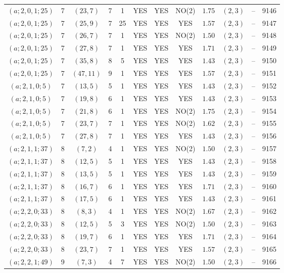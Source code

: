 \begin{longtable}{|c|c|c|c|c|c|c|c|c|c|c|c|}
$(a;2,0,1;25)$ & 7 & $(23,7)$ & 7 & 1 & YES & YES & NO(2) & $1.75$ & $(2,3)$ & -- & 9146\\
$(a;2,0,1;25)$ & 7 & $(25,9)$ & 7 & 25 & YES & YES & YES & $1.57$ & $(2,3)$ & -- & 9147\\
$(a;2,0,1;25)$ & 7 & $(26,7)$ & 7 & 1 & YES & YES & NO(2) & $1.50$ & $(2,3)$ & -- & 9148\\
$(a;2,0,1;25)$ & 7 & $(27,8)$ & 7 & 1 & YES & YES & YES & $1.71$ & $(2,3)$ & -- & 9149\\
$(a;2,0,1;25)$ & 7 & $(35,8)$ & 8 & 5 & YES & YES & YES & $1.43$ & $(2,3)$ & -- & 9150\\
$(a;2,0,1;25)$ & 7 & $(47,11)$ & 9 & 1 & YES & YES & YES & $1.57$ & $(2,3)$ & -- & 9151\\
$(a;2,1,0;5)$ & 7 & $(13,5)$ & 5 & 1 & YES & YES & YES & $1.43$ & $(2,3)$ & -- & 9152\\
$(a;2,1,0;5)$ & 7 & $(19,8)$ & 6 & 1 & YES & YES & YES & $1.43$ & $(2,3)$ & -- & 9153\\
$(a;2,1,0;5)$ & 7 & $(21,8)$ & 6 & 1 & YES & YES & NO(2) & $1.75$ & $(2,3)$ & -- & 9154\\
$(a;2,1,0;5)$ & 7 & $(23,7)$ & 7 & 1 & YES & YES & NO(2) & $1.62$ & $(2,3)$ & -- & 9155\\
$(a;2,1,0;5)$ & 7 & $(27,8)$ & 7 & 1 & YES & YES & YES & $1.43$ & $(2,3)$ & -- & 9156\\
$(a;2,1,1;37)$ & 8 & $(7,2)$ & 4 & 1 & YES & YES & NO(2) & $1.50$ & $(2,3)$ & -- & 9157\\
$(a;2,1,1;37)$ & 8 & $(12,5)$ & 5 & 1 & YES & YES & YES & $1.43$ & $(2,3)$ & -- & 9158\\
$(a;2,1,1;37)$ & 8 & $(13,5)$ & 5 & 1 & YES & YES & YES & $1.43$ & $(2,3)$ & -- & 9159\\
$(a;2,1,1;37)$ & 8 & $(16,7)$ & 6 & 1 & YES & YES & YES & $1.71$ & $(2,3)$ & -- & 9160\\
$(a;2,1,1;37)$ & 8 & $(17,5)$ & 6 & 1 & YES & YES & YES & $1.43$ & $(2,3)$ & -- & 9161\\
$(a;2,2,0;33)$ & 8 & $(8,3)$ & 4 & 1 & YES & YES & NO(2) & $1.67$ & $(2,3)$ & -- & 9162\\
$(a;2,2,0;33)$ & 8 & $(12,5)$ & 5 & 3 & YES & YES & NO(2) & $1.50$ & $(2,3)$ & -- & 9163\\
$(a;2,2,0;33)$ & 8 & $(19,7)$ & 6 & 1 & YES & YES & YES & $1.71$ & $(2,3)$ & -- & 9164\\
$(a;2,2,0;33)$ & 8 & $(23,7)$ & 7 & 1 & YES & YES & YES & $1.57$ & $(2,3)$ & -- & 9165\\
$(a;2,2,1;49)$ & 9 & $(7,3)$ & 4 & 7 & YES & YES & NO(2) & $1.50$ & $(2,3)$ & -- & 9166\\

\end{longtable}
